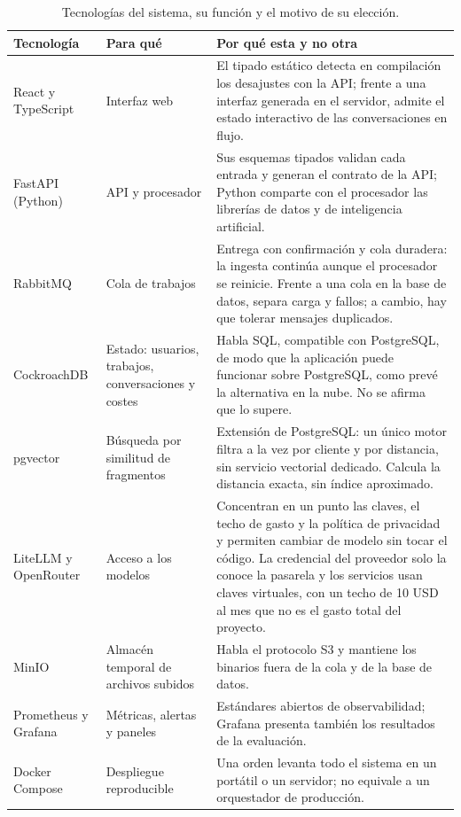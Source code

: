 \begin{table}[htbp]
\centering\footnotesize
\caption{Tecnologías del sistema, su función y el motivo de su elección.}\label{tab-d2}
\begin{tabular}{@{}>{\raggedright\arraybackslash}p{}>{\raggedright\arraybackslash}p{}>{\raggedright\arraybackslash}p{}@{}}
\toprule
\textbf{Tecnología} & \textbf{Para qué} & \textbf{Por qué esta y no otra} \\
\midrule
React y TypeScript & Interfaz web & El tipado estático detecta en compilación los desajustes con la API; frente a una interfaz generada en el servidor, admite el estado interactivo de las conversaciones en flujo. \\
FastAPI (Python) & API y procesador & Sus esquemas tipados validan cada entrada y generan el contrato de la API; Python comparte con el procesador las librerías de datos y de inteligencia artificial. \\
RabbitMQ & Cola de trabajos & Entrega con confirmación y cola duradera: la ingesta continúa aunque el procesador se reinicie. Frente a una cola en la base de datos, separa carga y fallos; a cambio, hay que tolerar mensajes duplicados. \\
CockroachDB & Estado: usuarios, trabajos, conversaciones y costes & Habla SQL, compatible con PostgreSQL, de modo que la aplicación puede funcionar sobre PostgreSQL, como prevé la alternativa en la nube. No se afirma que lo supere. \\
pgvector & Búsqueda por similitud de fragmentos & Extensión de PostgreSQL: un único motor filtra a la vez por cliente y por distancia, sin servicio vectorial dedicado. Calcula la distancia exacta, sin índice aproximado. \\
LiteLLM y OpenRouter & Acceso a los modelos & Concentran en un punto las claves, el techo de gasto y la política de privacidad y permiten cambiar de modelo sin tocar el código. La credencial del proveedor solo la conoce la pasarela y los servicios usan claves virtuales, con un techo de 10 USD al mes que no es el gasto total del proyecto. \\
MinIO & Almacén temporal de archivos subidos & Habla el protocolo S3 y mantiene los binarios fuera de la cola y de la base de datos. \\
Prometheus y Grafana & Métricas, alertas y paneles & Estándares abiertos de observabilidad; Grafana presenta también los resultados de la evaluación. \\
Docker Compose & Despliegue reproducible & Una orden levanta todo el sistema en un portátil o un servidor; no equivale a un orquestador de producción. \\
\bottomrule
\end{tabular}
\end{table}

